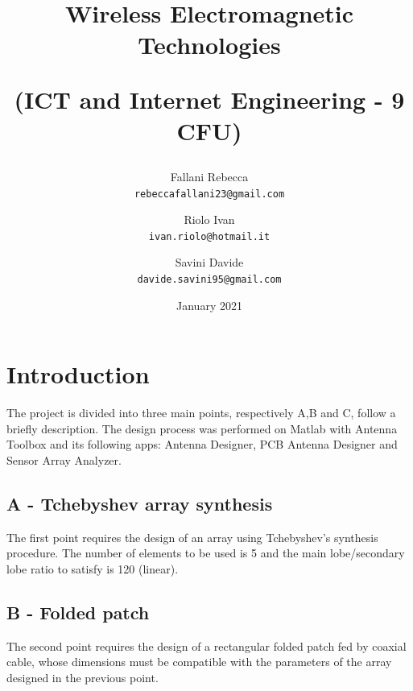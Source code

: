 \documentclass[11pt]{report}
\title{Wireless Electromagnetic Technologies\newline\begin{small}(ICT and Internet Engineering - 9 CFU)\end{small}}
\author{
  Fallani Rebecca\\
  \texttt{rebeccafallani23@gmail.com}
  \and
  Riolo Ivan\\
  \texttt{ivan.riolo@hotmail.it}
   \and
  Savini Davide\\
  \texttt{davide.savini95@gmail.com}
}
\date{January 2021}
\begin{document}
\maketitle
\thispagestyle{empty}
\tableofcontents
\thispagestyle{empty}
\chapter*{Introduction}
\thispagestyle{empty}

The project is divided into three main points, respectively A,B and C, follow a briefly description. The design process was performed on Matlab with Antenna Toolbox and its following apps: Antenna Designer, PCB Antenna Designer and Sensor Array Analyzer.
\section*{A - Tchebyshev array synthesis}
The first point requires the design of an array using Tchebyshev's synthesis procedure. The number of elements to be used is 5 and the main lobe/secondary lobe ratio to satisfy is 120 (linear).
\section*{B - Folded patch}
The second point requires the design of a rectangular folded patch fed by coaxial cable, whose dimensions must be compatible with the parameters of the array designed in the previous point.
\end{document}
